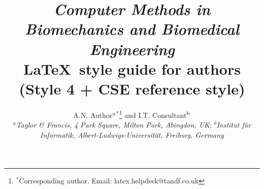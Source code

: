\documentclass{gCMB2e}
\begin{document}


\title{{\itshape Computer Methods in Biomechanics and Biomedical Engineering}\\ \LaTeX\ style guide for authors (Style 4 + CSE reference style)}

\author{A.N. Author$^{\rm a}$$^{\ast}$\thanks{$^\ast$Corresponding author. Email: latex.helpdesk@tandf.co.uk
\vspace{6pt}} and I.T. Consultant$^{\rm b}$\\\vspace{6pt} $^{a}${\em{Taylor \& Francis, 4 Park Square, Milton Park, Abingdon, UK}};
$^{b}${\em{Institut f\"{u}r Informatik, Albert-Ludwigs-Universit\"{a}t, Freiburg,
Germany}}\\ }

\maketitle
\end{document}
